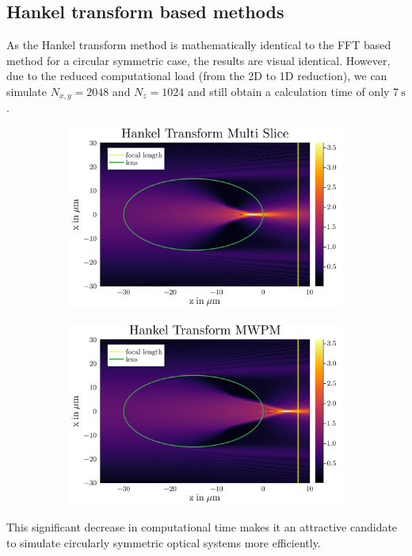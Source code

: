 \documentclass[a4paper,12pt]{article}
\begin{document}
\subsection{Hankel transform based methods}
As the Hankel transform method is mathematically identical to the FFT based method for a circular symmetric case, the results are visual identical.
However, due to the reduced computational load (from the 2D to 1D reduction), we can simulate $N_{x,y} = 2048$ and $N_z=1024$ and still obtain a calculation time of only $\SI{7}{\second}$. 
\begin{figure}[h]
    \centering
    \begin{subfigure}[]{0.5\textwidth}
        \centering
        \includegraphics[width=\textwidth]{../figures/Hankel_normal.svg.png} 
    \end{subfigure}%
    \begin{subfigure}[]{0.5\textwidth}
        \centering
        \includegraphics[width=\textwidth]{../figures/Hankel_MWPM.svg.png} 
    \end{subfigure}
    \caption{}
    \label{fig:}
\end{figure}
This significant decrease in computational time makes it an attractive candidate
to simulate circularly symmetric optical systems more efficiently.
\end{document}
